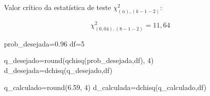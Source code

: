 \documentclass[
]{book}
\newenvironment{Shaded}{\begin{snugshade}}{\end{snugshade}}
\newcommand{\DecValTok}[1]{\textcolor[rgb]{0.00,0.00,0.81}{#1}}
\newcommand{\FloatTok}[1]{\textcolor[rgb]{0.00,0.00,0.81}{#1}}
\newcommand{\FunctionTok}[1]{\textcolor[rgb]{0.00,0.00,0.00}{#1}}
\newcommand{\NormalTok}[1]{#1}
\newcommand{\OtherTok}[1]{\textcolor[rgb]{0.56,0.35,0.01}{#1}}
\begin{document}
\hfill\break

Valor crítico da estatística de teste \(\chi^{2}_{(\alpha), (k-1-2)}\):

\hfill\break

\[
\chi^{2}_{(0,04), (8-1-2)}=11,64
\]

\hfill\break

\begin{Shaded}
\begin{Highlighting}[]
\NormalTok{prob\_desejada}\OtherTok{=}\FloatTok{0.96}
\NormalTok{df}\OtherTok{=}\DecValTok{5}

\NormalTok{q\_desejado}\OtherTok{=}\FunctionTok{round}\NormalTok{(}\FunctionTok{qchisq}\NormalTok{(prob\_desejada,df), }\DecValTok{4}\NormalTok{)}
\NormalTok{d\_desejada}\OtherTok{=}\FunctionTok{dchisq}\NormalTok{(q\_desejado,df)}


\NormalTok{q\_calculado}\OtherTok{=}\FunctionTok{round}\NormalTok{(}\FloatTok{6.59}\NormalTok{, }\DecValTok{4}\NormalTok{)}
\NormalTok{d\_calculada}\OtherTok{=}\FunctionTok{dchisq}\NormalTok{(q\_calculado,df)}



\end{Highlighting}
\end{Shaded}
\end{document}
